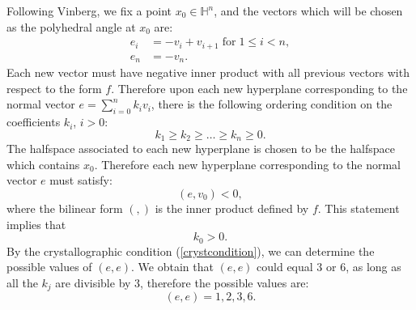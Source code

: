 \documentclass[smallcondensed]{svjour3}                     %
\begin{document}
Following Vinberg, we fix a point $x_0 \in \mathbb{H}^n$, and the vectors which will be chosen as the polyhedral angle at $x_0$ are:
\begin{align*}
e_i &= -v_i + v_{i+1} \; \mathrm{for}\; 1 \le i < n,\\
e_n &= -v_n.
\end{align*}
Each new vector must have negative inner product with all previous vectors with respect to the form $f$. Therefore upon each new hyperplane corresponding to the normal vector $e= \sum_{i=0}^nk_iv_i$, there is the following ordering condition on the coefficients $k_i$, $i>0$:
\begin{equation}
k_1\ge k_2 \ge \ldots \ge k_n \ge 0. \label{k_i_ordering}
\end{equation}
The halfspace associated to each new hyperplane is chosen to be the halfspace which contains $x_0$. Therefore each new hyperplane corresponding to the normal vector $e$ must satisfy:
\[(e, v_0) < 0,\]
where the bilinear form $(,)$ is the inner product defined by $f$. This statement implies that
\begin{equation}
k_0 > 0. \label{positive_k_0}
\end{equation}
By the crystallographic condition (\ref{crystcondition}), we can determine the possible values of $(e,e)$. We obtain that $(e, e)$ could equal $3$ or $6$, as long as all the $k_j$ are divisible by $3$, therefore the possible values are:
\begin{equation}\label{epsilon}
(e, e) = 1, 2, 3, 6.
\end{equation}
\end{document}

